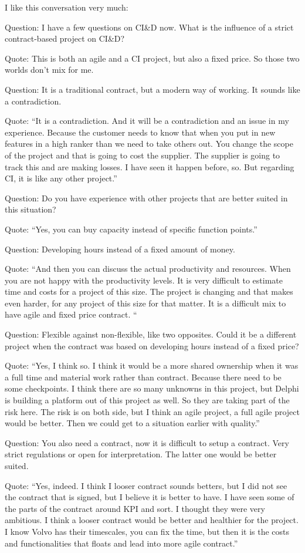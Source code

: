 {I like this conversation very much:

Question: I have a few questions on CI&D now. What is the influence of a strict contract-based project on CI&D?

Quote: This is both an agile and a CI project, but also a fixed price. So those two worlds don’t mix for me.

Question: It is a traditional contract, but a modern way of working. It sounds like a contradiction.

Quote: “It is a contradiction. And it will be a contradiction and an issue in my experience. Because the customer needs to know that when you put in new features in a high ranker than we need to take others out. You change the scope of the project and that is going to cost the supplier. The supplier is going to track this and are making losses. I have seen it happen before, so. But regarding CI, it is like any other project.”

Question: Do you have experience with other projects that are better suited in this situation?

Quote: “Yes, you can buy capacity instead of specific function points.” 

Question: Developing hours instead of a fixed amount of money.

Quote: “And then you can discuss the actual productivity and resources. When you are not happy with the productivity levels. It is very difficult to estimate time and costs for a project of this size. The project is changing and that makes even harder, for any project of this size for that matter. It is a difficult mix to have agile and fixed price contract. “

Question: Flexible against non-flexible, like two opposites. Could it be a different project when the contract was based on developing hours instead of a fixed price?

Quote: “Yes, I think so. I think it would be a more shared ownership when it was a full time and material work rather than contract. Because there need to be some checkpoints. I think there are so many unknowns in this project, but Delphi is building a platform out of this project as well. So they are taking part of the risk here. The risk is on both side, but I think an agile project, a full agile project would be better. Then we could get to a situation earlier with quality.”

Question: You also need a contract, now it is difficult to setup a contract. Very strict regulations or open for interpretation. The latter one would be better suited.

Quote: “Yes, indeed. I think I looser contract sounds betters, but I did not see the contract that is signed, but I believe it is better to have. I have seen some of the parts of the contract around KPI and sort. I thought they were very ambitious. I think a looser contract would be better and healthier for the project. I know Volvo has their timescales, you can fix the time, but then it is the costs and functionalities that floats and lead into more agile contract.”


}

